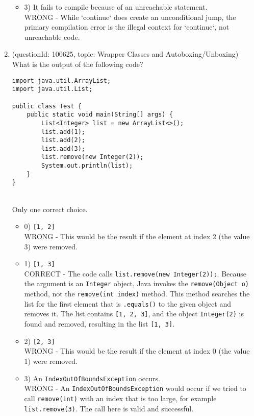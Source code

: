 \documentclass[12pt]{article}
\begin{document}
\begin{enumerate}[label=(\arabic*)]
\begin{itemize}
\item 3) It fails to compile because of an unreachable statement.
 \\ 
WRONG - While `continue` does create an unconditional jump, the primary compilation error is the illegal context for `continue`, not unreachable code.

\end{itemize}
\item (questionId: 100625, topic: Wrapper Classes and Autoboxing/Unboxing) \\ 
What is the output of the following code?\n\begin{verbatim}
import java.util.ArrayList;
import java.util.List;

public class Test {
    public static void main(String[] args) {
        List<Integer> list = new ArrayList<>();
        list.add(1);
        list.add(2);
        list.add(3);
        list.remove(new Integer(2));
        System.out.println(list);
    }
}
\end{verbatim}
\\ \noindent Only one correct choice. 
\begin{itemize}
\item 0) \verb|[1, 2]|
 \\ 
WRONG - This would be the result if the element at index 2 (the value 3) were removed.

\item 1) \verb|[1, 3]|
 \\ 
CORRECT - The code calls \verb|list.remove(new Integer(2));|. Because the argument is an \verb|Integer| object, Java invokes the \verb|remove(Object o)| method, not the \verb|remove(int index)| method. This method searches the list for the first element that is \verb|.equals()| to the given object and removes it. The list contains \verb|[1, 2, 3]|, and the object \verb|Integer(2)| is found and removed, resulting in the list \verb|[1, 3]|.

\item 2) \verb|[2, 3]|
 \\ 
WRONG - This would be the result if the element at index 0 (the value 1) were removed.

\item 3) An \verb|IndexOutOfBoundsException| occurs.
 \\ 
WRONG - An \verb|IndexOutOfBoundsException| would occur if we tried to call \verb|remove(int)| with an index that is too large, for example \verb|list.remove(3)|. The call here is valid and successful.


\end{itemize}
\end{enumerate}
\end{document}
